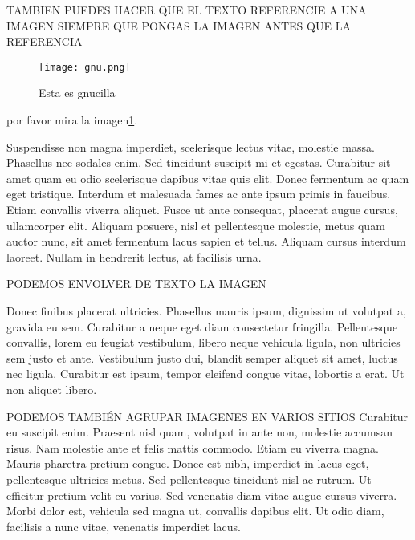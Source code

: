 TAMBIEN PUEDES HACER QUE EL TEXTO REFERENCIE A UNA IMAGEN SIEMPRE QUE PONGAS LA IMAGEN ANTES QUE LA REFERENCIA

\begin{figure}[h]
\begin{center}
\texttt{[image: gnu.png]}
\end{center}
\caption{Esta es gnucilla}\label{gnucilla}
\end{figure}

por favor mira la imagen\ref{gnucilla}.

Suspendisse non magna imperdiet, scelerisque lectus vitae, molestie massa. Phasellus nec sodales enim. Sed tincidunt suscipit mi et egestas. Curabitur sit amet quam eu odio scelerisque dapibus vitae quis elit. Donec fermentum ac quam eget tristique. Interdum et malesuada fames ac ante ipsum primis in faucibus. Etiam convallis viverra aliquet. Fusce ut ante consequat, placerat augue cursus, ullamcorper elit. Aliquam posuere, nisl et pellentesque molestie, metus quam auctor nunc, sit amet fermentum lacus sapien et tellus. Aliquam cursus interdum laoreet. Nullam in hendrerit lectus, at facilisis urna.

PODEMOS ENVOLVER DE TEXTO LA IMAGEN



Donec finibus placerat ultricies. Phasellus mauris ipsum, dignissim ut volutpat a, gravida eu sem. Curabitur a neque eget diam consectetur fringilla. Pellentesque convallis, lorem eu feugiat vestibulum, libero neque vehicula ligula, non ultricies sem justo et ante. Vestibulum justo dui, blandit semper aliquet sit amet, luctus nec ligula. Curabitur est ipsum, tempor eleifend congue vitae, lobortis a erat. Ut non aliquet libero.

PODEMOS TAMBIÉN AGRUPAR IMAGENES EN VARIOS SITIOS
Curabitur eu suscipit enim. Praesent nisl quam, volutpat in ante non, molestie accumsan risus. Nam molestie ante et felis mattis commodo. Etiam eu viverra magna. Mauris pharetra pretium congue. Donec est nibh, imperdiet in lacus eget, pellentesque ultricies metus. Sed pellentesque tincidunt nisl ac rutrum. Ut efficitur pretium velit eu varius. Sed venenatis diam vitae augue cursus viverra. Morbi dolor est, vehicula sed magna ut, convallis dapibus elit. Ut odio diam, facilisis a nunc vitae, venenatis imperdiet lacus.

